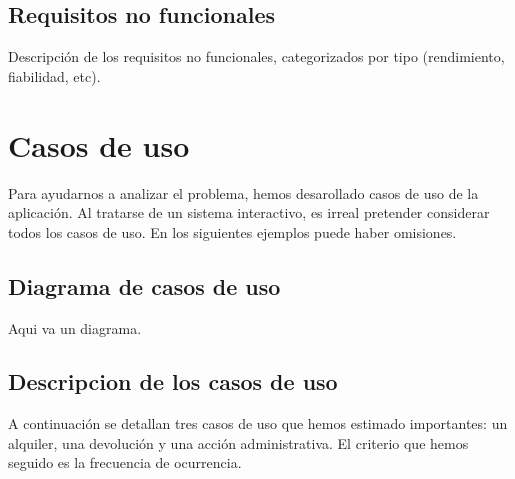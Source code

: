 \documentclass[11pt]{article}
\begin{document}
\subsection{Requisitos no funcionales}
Descripción de los requisitos no funcionales, categorizados por tipo (rendimiento, fiabilidad, etc).

\section{Casos de uso}
Para ayudarnos a analizar el problema, hemos desarollado casos de uso de la aplicación.
Al tratarse de un sistema interactivo, es irreal pretender considerar todos los casos de uso.
En los siguientes ejemplos puede haber omisiones.

\subsection{Diagrama de casos de uso}
Aqui va un diagrama.


\subsection{Descripcion de los casos de uso}
A continuación se detallan tres casos de uso que hemos estimado importantes: un alquiler, una devolución y una acción administrativa. El criterio que hemos seguido es la frecuencia de ocurrencia.
\end{document}
